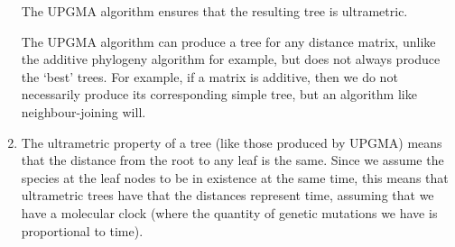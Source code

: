 \begin{enumerate}[label=(\alph*)]
The UPGMA algorithm ensures that the resulting tree is ultrametric.

The UPGMA algorithm can produce a tree for any distance matrix, unlike the additive phylogeny algorithm for example, but does not always produce the `best' trees. For example, if a matrix is additive, then we do not necessarily produce its corresponding simple tree, but an algorithm like neighbour-joining will.

\item
  The ultrametric property of a tree (like those produced by UPGMA) means that the distance from the root to any leaf is the same. Since we assume the species at the leaf nodes to be in existence at the same time, this means that ultrametric trees have that the distances represent time, assuming that we have a molecular clock (where the quantity of genetic mutations we have is proportional to time).


        
    \end{enumerate}

